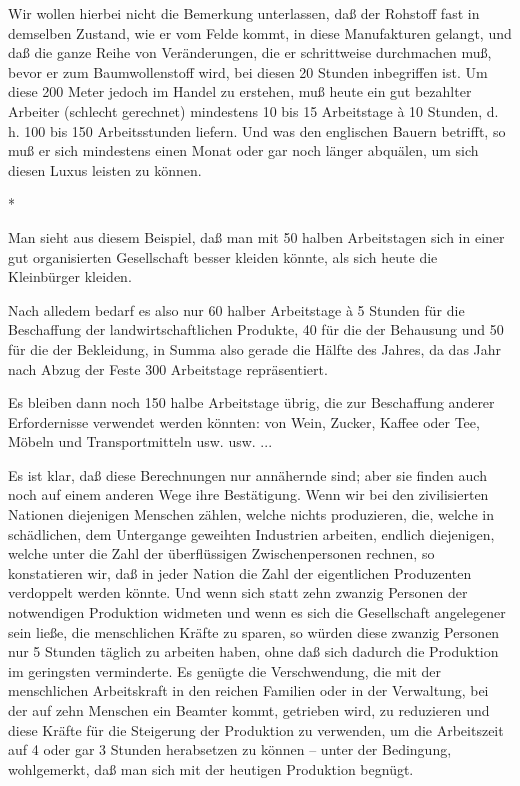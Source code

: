 \documentclass{scrbook}
\begin{document}
Wir wollen hierbei nicht die Bemerkung unterlassen, daß der Rohstoff fast in demselben Zustand, wie er vom Felde kommt, in diese Manufakturen gelangt, und daß die ganze Reihe von Veränderungen, die er schrittweise durchmachen muß, bevor er zum Baumwollenstoff wird, bei diesen 20 Stunden inbegriffen ist. Um diese 200 Meter jedoch im Handel zu erstehen, muß heute ein gut bezahlter Arbeiter (schlecht gerechnet) mindestens 10 bis 15 Arbeitstage à 10 Stunden, d. h. 100 bis 150 Arbeitsstunden liefern. Und was den englischen Bauern betrifft, so muß er sich mindestens einen Monat oder gar noch länger abquälen, um sich diesen Luxus leisten zu können.

\begin{center}*\end{center}

Man sieht aus diesem Beispiel, daß man mit 50 halben Arbeitstagen sich in einer gut organisierten Gesellschaft besser kleiden könnte, als sich heute die Kleinbürger kleiden.

Nach alledem bedarf es also nur 60 halber Arbeitstage à 5 Stunden für die Beschaffung der landwirtschaftlichen Produkte, 40 für die der Behausung und 50 für die der Bekleidung, in Summa also gerade die Hälfte des Jahres, da das Jahr nach Abzug der Feste 300 Arbeitstage repräsentiert.

Es bleiben dann noch 150 halbe Arbeitstage übrig, die zur Beschaffung anderer Erfordernisse verwendet werden könnten: von Wein, Zucker, Kaffee oder Tee, Möbeln und Transportmitteln usw. usw. ...

Es ist klar, daß diese Berechnungen nur annähernde sind; aber sie finden auch noch auf einem anderen Wege ihre Bestätigung. Wenn wir bei den zivilisierten Nationen diejenigen Menschen zählen, welche nichts produzieren, die, welche in schädlichen, dem Untergange geweihten Industrien arbeiten, endlich diejenigen, welche unter die Zahl der überflüssigen Zwischenpersonen rechnen, so konstatieren wir, daß in jeder Nation die Zahl der eigentlichen Produzenten verdoppelt werden könnte. Und wenn sich statt zehn zwanzig Personen der notwendigen Produktion widmeten und wenn es sich die Gesellschaft angelegener sein ließe, die menschlichen Kräfte zu sparen, so würden diese zwanzig Personen nur 5 Stunden täglich zu arbeiten haben, ohne daß sich dadurch die Produktion im geringsten verminderte. Es genügte die Verschwendung, die mit der menschlichen Arbeitskraft in den reichen Familien oder in der Verwaltung, bei der auf zehn Menschen ein Beamter kommt, getrieben wird, zu reduzieren und diese Kräfte für die Steigerung der Produktion zu verwenden, um die Arbeitszeit auf 4 oder gar 3 Stunden herabsetzen zu können – unter der Bedingung, wohlgemerkt, daß man sich mit der heutigen Produktion begnügt.
\end{document}
